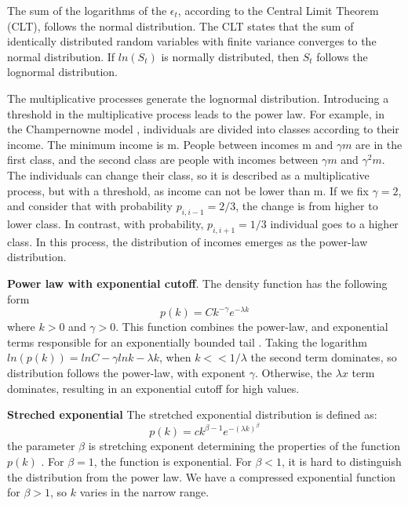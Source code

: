 The sum of the logarithms of the $\epsilon_t$, according to the Central Limit Theorem (CLT), follows the normal distribution. The CLT states that the sum of identically distributed random variables with finite variance converges to the normal distribution. If $ln(S_t)$ is normally distributed, then $S_t$ follows the lognormal distribution.   

The multiplicative processes generate the lognormal distribution. Introducing a threshold in the multiplicative process leads to the power law. For example, in the Champernowne model \cite{caldarelli2007scalefree}, individuals are divided into classes according to their income. The minimum income is m. People between incomes m and $\gamma m$ are in the first class, and the second class are people with incomes between $\gamma m$ and $\gamma^2 m $. The individuals can change their class, so it is described as a multiplicative process, but with a threshold, as income can not be lower than m. If we fix $\gamma=2$, and consider that with probability $p_{i,i-1}=2/3$, the change is from higher to lower class. In contrast, with probability, $p_{i, i+1}=1/3$ individual goes to a higher class. In this process, the distribution of incomes emerges as the power-law distribution.

\textbf{Power law with exponential cutoff}. The density function has the following form 
\begin{equation}
p(k) = C k^{-\gamma}e^{-\lambda k}
\end{equation}
where $k>0$ and $\gamma>0$. This function combines the power-law, and exponential terms responsible for an exponentially bounded tail \cite{barabasi2016network}. Taking the logarithm $ln(p(k)) = lnC - \gamma lnk - \lambda k$, when $k<<1/\lambda$ the second term dominates, so distribution follows the power-law, with exponent $\gamma$. Otherwise, the $\lambda x$ term dominates, resulting in an exponential cutoff for high values. 

\textbf{Streched exponential} The stretched exponential distribution is defined as:
\begin{equation}
p(k) = c k^{\beta - 1}e^{-(\lambda k)^{\beta}}
\end{equation}
the parameter $\beta$ is stretching exponent determining the properties of the function $p(k)$ \cite{barabasi2016network}. For $\beta=1$, the function is exponential. For $\beta<1$, it is hard to distinguish the distribution from the power law. We have a compressed exponential function for $\beta>1$, so $k$ varies in the narrow range. 


